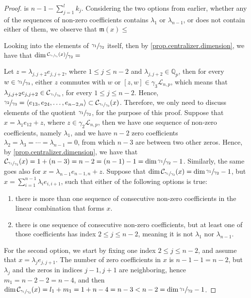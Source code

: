 \documentclass[12pt]{article}
\begin{document}
\begin{proof}
is $n-1-\sum_{j=1}^l k_j$. Considering the two options from earlier, whether any of the sequences of non-zero coefficients contains $\lambda_1$ or $\lambda_{n-1}$, or does not contain either of them, we observe that $\mathfrak{m}(x)\leq$

Looking into the elements of $\sfrac{\gamma_1}{\gamma_2}$ itself, then by \ref{prop.centralizer.dimension}, we have that $\dim\sfrac{\mathcal{C}_{\sfrac{\gamma_1}{\gamma_3}}(x)}{\gamma_2}=$




Let $z=\lambda_{j,j+2}e_{j,j+2}$, where $1\leq j\leq n-2$ and $\lambda_{j,j+2}\in\mathbb{Q}_p$, then for every $w\in\sfrac{\gamma_1}{\gamma_3}$, either $z$ commutes with $w$ or $[z,w]\in\gamma_3\mathcal{L}_{n,p}$, which means that $\lambda_{j,j+2}e_{j,j+2}\in\mathcal{C}_{\sfrac{\gamma_1}{\gamma_3}}$, for every $1\leq j\leq n-2$. Hence, $\sfrac{\gamma_2}{\gamma_3}=\langle e_{13},e_{24},\dots,e_{n-2,n}\rangle\subset\mathcal{C}_{\sfrac{\gamma_1}{\gamma_3}}(x)$. Therefore, we only need to discuss elements of the quotient $\sfrac{\gamma_1}{\gamma_2}$, for the purpose of this proof.
Suppose that $x=\lambda_1 e_{12}+z$, where $z\in\gamma_2\mathcal{L}_{n,p}$, then we have one sequence of non-zero coefficients, namely $\lambda_1$, and we have $n-2$ zero coefficients $\lambda_2=\lambda_3=\cdots=\lambda_{n-1}=0$, from which $n-3$ are between two other zeros. Hence, by \ref{prop.centralizer.dimension}, we have that $\mathcal{C}_{\sfrac{\gamma_1}{\gamma_2}}(x)=1+(n-3)=n-2=(n-1)-1=\dim\sfrac{\gamma_1}{\gamma_2}-1$. Similarly, the same goes also for $x=\lambda_{n-1}e_{n-1,n}+z$.
Suppose that $\dim\mathcal{C}_{\sfrac{\gamma_1}{\gamma_2}}(x)=\dim\sfrac{\gamma_1}{\gamma_2}-1$, but $x=\sum_{i=1}^{n-1}\lambda_i e_{i,i+1}$, such that either of the following options is true:
\begin{enumerate}
  \item there is more than one sequence of consecutive non-zero coefficients in the linear combination that forms $x$.
  \item there is one sequence of consecutive non-zero coefficients, but at least one of those coefficients has index $2\leq j\leq n-2$, meaning it is not $\lambda_1$ nor $\lambda_{n-1}$.
\end{enumerate}
For the second option, we start by fixing one index $2\leq j\leq n-2$, and assume that $x=\lambda_j e_{j,j+1}$. The number of zero coefficients in $x$ is $n-1-1=n-2$, but $\lambda_j$ and the zeros in indices $j-1,j+1$ are neighboring, hence $m_1=n-2-2=n-4$, and then $\dim\mathcal{C}_{\sfrac{\gamma_1}{\gamma_2}}(x)=l_1+m_1=1+n-4=n-3<n-2=\dim\sfrac{\gamma_1}{\gamma_2}-1$.

\end{proof}
\end{document}
